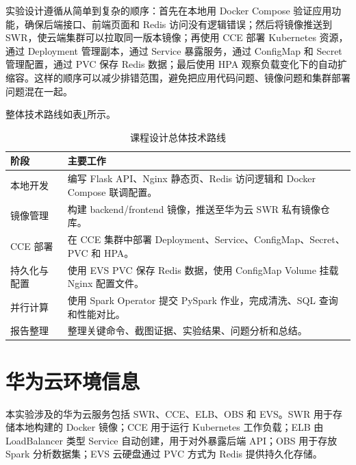 \documentclass[bwprint]{report}
\begin{document}
实验设计遵循从简单到复杂的顺序：首先在本地用 Docker Compose 验证应用功能，确保后端接口、前端页面和 Redis 访问没有逻辑错误；然后将镜像推送到 SWR，使云端集群可以拉取同一版本镜像；再使用 CCE 部署 Kubernetes 资源，通过 Deployment 管理副本，通过 Service 暴露服务，通过 ConfigMap 和 Secret 管理配置，通过 PVC 保存 Redis 数据；最后使用 HPA 观察负载变化下的自动扩缩容。这样的顺序可以减少排错范围，避免把应用代码问题、镜像问题和集群部署问题混在一起。

整体技术路线如表\ref{tab:overall-plan}所示。

\begin{table}[!htbp]
    \centering
    \caption{课程设计总体技术路线}
    \label{tab:overall-plan}
    \begin{tabularx}{\textwidth}{lX}
        \toprule[1.5pt]
        阶段 & 主要工作 \\
        \midrule[1pt]
        本地开发 & 编写 Flask API、Nginx 静态页、Redis 访问逻辑和 Docker Compose 联调配置。 \\
        镜像管理 & 构建 backend/frontend 镜像，推送至华为云 SWR 私有镜像仓库。 \\
        CCE 部署 & 在 CCE 集群中部署 Deployment、Service、ConfigMap、Secret、PVC 和 HPA。 \\
        持久化与配置 & 使用 EVS PVC 保存 Redis 数据，使用 ConfigMap Volume 挂载 Nginx 配置文件。 \\
        并行计算 & 使用 Spark Operator 提交 PySpark 作业，完成清洗、SQL 查询和性能对比。 \\
        报告整理 & 整理关键命令、截图证据、实验结果、问题分析和总结。 \\
        \bottomrule[1.5pt]
    \end{tabularx}
\end{table}

\section{华为云环境信息}

本实验涉及的华为云服务包括 SWR、CCE、ELB、OBS 和 EVS。SWR 用于存储本地构建的 Docker 镜像；CCE 用于运行 Kubernetes 工作负载；ELB 由 LoadBalancer 类型 Service 自动创建，用于对外暴露后端 API；OBS 用于存放 Spark 分析数据集；EVS 云硬盘通过 PVC 方式为 Redis 提供持久化存储。
\end{document}
